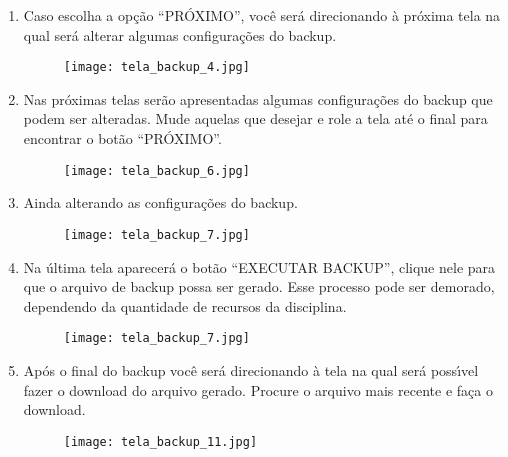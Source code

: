 \documentclass[12pt]{report}
\begin{document}
\begin{enumerate}[\bf 1)]
  	\newpage

	\item Caso escolha a op\c{c}\~ao ``PR\'OXIMO'', voc\^e ser\'a direcionando \`a pr\'oxima tela na qual ser\'a alterar algumas configura\c{c}\~oes do backup.
	\begin{figure}[H]
    	\centering
    	\hspace*{-2.5cm}\texttt{[image: tela\_backup\_4.jpg]}
  	\end{figure}

  	\newpage

	\item Nas pr\'oximas telas ser\~ao apresentadas algumas configura\c{c}\~oes do backup que podem ser alteradas. Mude aquelas que desejar e role a tela at\'e o final para encontrar o bot\~ao ``PR\'OXIMO''.
	\begin{figure}[H]
    	\centering
    	\hspace*{-2.5cm}\texttt{[image: tela\_backup\_6.jpg]}
  	\end{figure}

  	\newpage

	\item Ainda alterando as configura\c{c}\~oes do backup.
	\begin{figure}[H]
    	\centering
    	\hspace*{-2.5cm}\texttt{[image: tela\_backup\_7.jpg]}
  	\end{figure}

  	\newpage

	\item Na \'ultima tela aparecer\'a o bot\~ao ``EXECUTAR BACKUP'', clique nele para que o arquivo de backup possa ser gerado. Esse processo pode ser demorado, dependendo da quantidade de recursos da disciplina.
	\begin{figure}[H]
    	\centering
    	\hspace*{-2.5cm}\texttt{[image: tela\_backup\_7.jpg]}
  	\end{figure}

  	\newpage

	\item Ap\'os o final do backup voc\^e ser\'a direcionando \`a tela na qual ser\'a poss{\'\i}vel fazer o download do arquivo gerado. Procure o arquivo mais recente e fa\c{c}a o download.
	\begin{figure}[H]
    	\centering
    	\hspace*{-2.5cm}\texttt{[image: tela\_backup\_11.jpg]}
  	\end{figure}
\end{enumerate}
\end{document}
